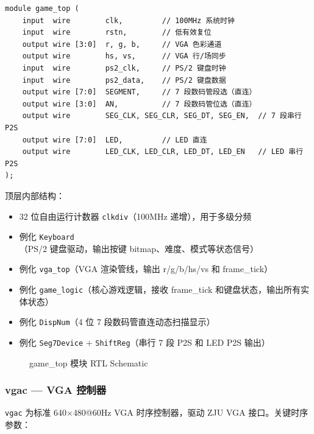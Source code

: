 \documentclass[12pt,a4paper]{ctexart}
\begin{document}
\begin{lstlisting}
module game_top (
    input  wire        clk,         // 100MHz 系统时钟
    input  wire        rstn,        // 低有效复位
    output wire [3:0]  r, g, b,     // VGA 色彩通道
    output wire        hs, vs,      // VGA 行/场同步
    input  wire        ps2_clk,     // PS/2 键盘时钟
    input  wire        ps2_data,    // PS/2 键盘数据
    output wire [7:0]  SEGMENT,     // 7 段数码管段选（直连）
    output wire [3:0]  AN,          // 7 段数码管位选（直连）
    output wire        SEG_CLK, SEG_CLR, SEG_DT, SEG_EN,  // 7 段串行 P2S
    output wire [7:0]  LED,         // LED 直连
    output wire        LED_CLK, LED_CLR, LED_DT, LED_EN   // LED 串行 P2S
);
\end{lstlisting}

顶层内部结构：
\begin{itemize}
    \item 32 位自由运行计数器 \texttt{clkdiv}（100MHz 递增），用于多级分频
    \item 例化 \texttt{Keyboard}（PS/2 键盘驱动，输出按键 bitmap、难度、模式等状态信号）
    \item 例化 \texttt{vga\_top}（VGA 渲染管线，输出 r/g/b/hs/vs 和 frame\_tick）
    \item 例化 \texttt{game\_logic}（核心游戏逻辑，接收 frame\_tick 和键盘状态，输出所有实体状态）
    \item 例化 \texttt{DispNum}（4 位 7 段数码管直连动态扫描显示）
    \item 例化 \texttt{Seg7Device} + \texttt{ShiftReg}（串行 7 段 P2S 和 LED P2S 输出）
\end{itemize}

\begin{figure}[H]
\centering
\caption{game\_top 模块 RTL Schematic}
\label{fig:gametop_rtl}
\end{figure}

\subsubsection{vgac --- VGA 控制器}

\texttt{vgac} 为标准 640$\times$480@60Hz VGA 时序控制器，驱动 ZJU VGA 接口。关键时序参数：
\end{document}

